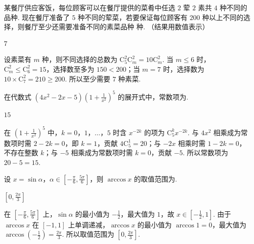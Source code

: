 \begin{problem}
某餐厅供应客饭，每位顾客可以在餐厅提供的菜肴中任选 \(2\) 荤 \(2\) 素共 \(4\) 种不同的品种. 现在餐厅准备了 \(5\) 种不同的荤菜，若要保证每位顾客有 \(200\) 种以上不同的选择，则餐厅至少还需要准备不同的素菜品种\fillinblank{} 种. （结果用数值表示）
\end{problem}

\begin{answer}
\(7\)
\end{answer}

\begin{solution}
设素菜有 \(m\) 种，则不同选择的总数为 \(\mathrm C_5^2\mathrm C_m^2=10\mathrm C_m^2\). 当 \(m\leqslant6\) 时，\(\mathrm C_m^2\leqslant\mathrm C_6^2=15\)，选择数至多为 \(150<200\)；当 \(m=7\) 时，选择数为 \(10\times\mathrm C_7^2=210\geqslant200\). 所以至少需要 \(7\) 种素菜.
\end{solution}

\begin{problem}
在代数式 \((4x^2-2x-5)\left(1+\frac1{x^2}\right)^5\) 的展开式中，常数项为\fillinblank{}.
\end{problem}

\begin{answer}
\(15\)
\end{answer}

\begin{solution}
在 \(\left(1+\frac1{x^2}\right)^5\) 中，\(k=0\)，\(1\)，\(\ldots\)，\(5\) 时含 \(x^{-2k}\) 的项为 \(\mathrm C_5^k x^{-2k}\). 与 \(4x^2\) 相乘成为常数项时需 \(2-2k=0\)，即 \(k=1\)，贡献 \(4\mathrm C_5^1=20\)；与 \(-2x\) 相乘时需 \(1-2k=0\)，不存在整数 \(k\)；与 \(-5\) 相乘成为常数项时需 \(k=0\)，贡献 \(-5\). 所以常数项为 \(20-5=15\).
\end{solution}

\begin{problem}
设 \(x=\sin\alpha\)，\(\alpha\in\left[-\frac\pi6,\frac{5\pi}6\right]\)，则 \(\arccos x\) 的取值范围为\fillinblank{}.
\end{problem}

\begin{answer}
\(\left[0,\frac{2\pi}{3}\right]\)
\end{answer}

\begin{solution}
在 \(\left[-\frac\pi6,\frac{5\pi}6\right]\) 上，\(\sin\alpha\) 的最小值为 \(-\frac12\)，最大值为 \(1\)，故 \(x\in\left[-\frac12,1\right]\). 由于 \(\arccos x\) 在 \([-1,1]\) 上单调递减，\(\arccos x\) 的最小值为 \(\arccos1=0\)，最大值为 \(\arccos\left(-\frac12\right)=\frac{2\pi}3\). 所以取值范围为 \(\left[0,\frac{2\pi}{3}\right]\).
\end{solution}

